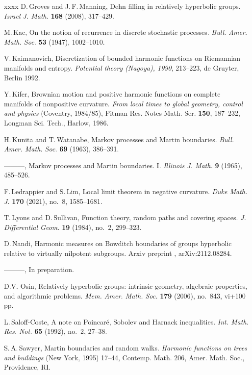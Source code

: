 \documentclass[12pt,a4paper]{amsart}
\numberwithin{equation}{section}
\theoremstyle{definition}
\begin{document}
\begin{thebibliography}{xxxx}
D.\,Groves and J.\,F.\,Manning,
Dehn filling in relatively hyperbolic groups.
\emph{Israel J. Math.} {\bf 168} (2008), 317--429.

M.\,Kac,
On the notion of recurrence in discrete stochastic processes.
\emph{Bull. Amer. Math. Soc.} {\bf 53} (1947), 1002--1010.
  
V.\,Kaimanovich,
Discretization of bounded harmonic functions on Riemannian manifolds and entropy.
\emph{Potential theory (Nagoya), 1990}, 213--223, de Gruyter, Berlin 1992.

Y.\,Kifer,
Brownian motion and positive harmonic functions on complete manifolds of nonpositive curvature.
\emph{From local times to global geometry, control and physics} (Coventry, 1984/85),
Pitman Res. Notes Math. Ser. {\bf 150}, 187--232, Longman Sci. Tech., Harlow, 1986.

H.\,Kunita and T.\,Watanabe,
Markov processes and Martin boundaries.
\emph{Bull. Amer. Math. Soc.} {\bf 69} (1963), 386--391.

---{}---{}---,
Markov processes and Martin boundaries. I.
\emph{Illinois J. Math.} {\bf 9} (1965), 485--526.

{F.\,Ledrappier and S.\,Lim},
Local limit theorem in negative curvature.
\emph{Duke Math. J.} {\bf 170} (2021), no.~8, 1585--1681.

T.\,Lyons and D.\,Sullivan,
Function theory, random paths and covering spaces.
\emph{J. Differential Geom.} {\bf 19} (1984), no.~2, 299--323.

D.\,Nandi,
Harmonic measures on Bowditch boundaries of groups hyperbolic relative to virtually nilpotent subgroups.
Arxiv preprint , arXiv:2112.08284.

---{}---{}---,
In preparation.

D.V. Osin,
Relatively hyperbolic groups: intrinsic geometry, algebraic properties, and algorithmic problems.
\emph{Mem. Amer. Math. Soc.} \textbf{179} (2006), no.~843, vi+100 pp. 

L.\,Saloff-Coste,
A note on Poincar\'e, Sobolev and Harnack inequalities.
\emph{Int. Math. Res. Not.} {\bf 65} (1992), no.~2, 27--38.

S.\,A.\,Sawyer, Martin boundaries and random walks.
\emph{Harmonic functions on trees and buildings} (New York, 1995)
17--44, Contemp. Math. 206, Amer. Math. Soc., Providence, RI.


\end{thebibliography}
\end{document}
